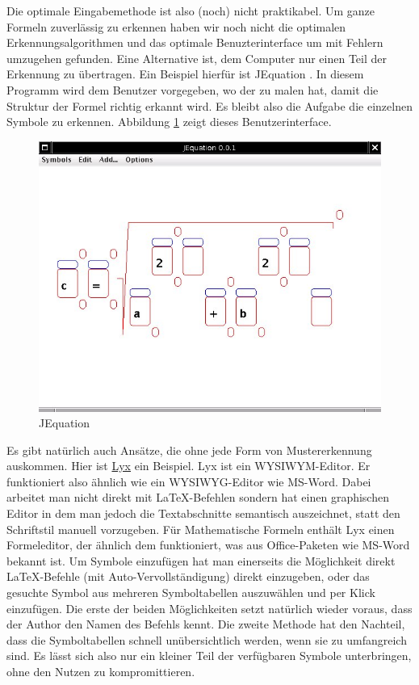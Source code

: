 Die optimale Eingabemethode ist also (noch) nicht praktikabel. Um ganze Formeln zuverlässig zu erkennen haben wir noch nicht die optimalen Erkennungsalgorithmen und das optimale Benuzterinterface um mit Fehlern umzugehen gefunden. Eine Alternative ist, dem Computer nur einen Teil der Erkennung zu übertragen. Ein Beispiel hierfür ist JEquation \cite{jequation}. In diesem Programm wird dem Benutzer vorgegeben, wo der zu malen hat, damit die Struktur der Formel richtig erkannt wird. Es bleibt also die Aufgabe die einzelnen Symbole zu erkennen. Abbildung \ref{fig:jequation} zeigt dieses Benutzerinterface.

\begin{figure}[htbp]
  \begin{center}
    \includegraphics[width=.8\textwidth]{figures/jequation.png}
  \end{center}
  \caption{JEquation}
  \label{fig:jequation}
\end{figure}

Es gibt natürlich auch Ansätze, die ohne jede Form von Mustererkennung auskommen. Hier ist \href{http://lyx.org}{Lyx} ein Beispiel. Lyx ist ein \ac{WYSIWYM}-Editor. Er funktioniert also ähnlich wie ein \ac{WYSIWYG}-Editor wie MS-Word. Dabei arbeitet man nicht direkt mit \LaTeX-Befehlen sondern hat einen graphischen Editor in dem man jedoch die Textabschnitte semantisch auszeichnet, statt den Schriftstil manuell vorzugeben. Für Mathematische Formeln enthält Lyx einen Formeleditor, der ähnlich dem funktioniert, was aus Office-Paketen wie MS-Word bekannt ist. Um Symbole einzufügen hat man einerseits die Möglichkeit direkt \LaTeX-Befehle (mit Auto-Vervollständigung) direkt einzugeben, oder das gesuchte Symbol aus mehreren Symboltabellen auszuwählen und per Klick einzufügen. Die erste der beiden Möglichkeiten setzt natürlich wieder voraus, dass der Author den Namen des Befehls kennt. Die zweite Methode hat den Nachteil, dass die Symboltabellen schnell unübersichtlich werden, wenn sie zu umfangreich sind. Es lässt sich also nur ein kleiner Teil der verfügbaren Symbole unterbringen, ohne den Nutzen zu kompromittieren.


